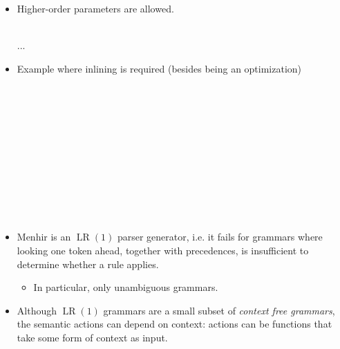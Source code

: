 \documentclass{beamer}
\newcommand{\tmem}[1]{{\em #1\/}}
\newcommand{\tmop}[1]{\ensuremath{\operatorname{#1}}}
\begin{document}
\begin{itemize}
  \item Higher-order parameters are allowed.
  
  {}{\hlopt{(}}{}{\hlopt{):}}{\hlendline{}}\\
  {\hlopt{\textbar }}{}{}{\hlopt{(}}{}{\hlopt{) }}{}{}{}{\hlopt{\{}}...{\hlopt{\}}}
  
  \item Example where inlining is required (besides being an optimization)
  
  {\hlopt{\%}}{}{\hlopt{< }}{}{\hlopt{>
  }}{}{\hlendline{}}\\
  {\hlopt{\%}}{}{}{\hlendline{}}\\
  {\hlopt{\%}}{}{}{\hlendline{}}\\
  {\hlopt{\%}}{}{}{}\\
  {\hlopt{\%\%}}{\hlendline{}}\\
  {}{\hlopt{:}}{\hlendline{}}\\
  {}{\hlopt{= }}{}{\hlopt{\{
  }}{}{\hlopt{\}}}{}\\
  {}{\hlopt{= }}{}{\hlopt{;
  }}{}{\hlopt{= }}{}{\hlopt{; }}{}{\hlopt{=
  }}{}{\hlopt{\{ }}{}{\hlopt{\}}}{\hlendline{}}\\
  {\hlopt{\%}}{}{\hlopt{:}}{}\\
  {\hlopt{\textbar }}{}{\hlopt{\{ ( + ) \}}}{\hlendline{}}\\
  {\hlopt{\textbar }}{}{\hlopt{\{ ( * ) \}}}{\hlendline{}}
  
  \item Menhir is an $\tmop{LR} (1)$ parser generator, i.e. it fails for
  grammars where looking one token ahead, together with precedences, is
  insufficient to determine whether a rule applies.
  \begin{itemize}
    \item In particular, only unambiguous grammars.
  \end{itemize}
  \item Although $\tmop{LR} (1)$ grammars are a small subset of {\tmem{context
  free grammars}}, the semantic actions can depend on context: actions can be
  functions that take some form of context as input.
  

\end{itemize}
\end{document}
